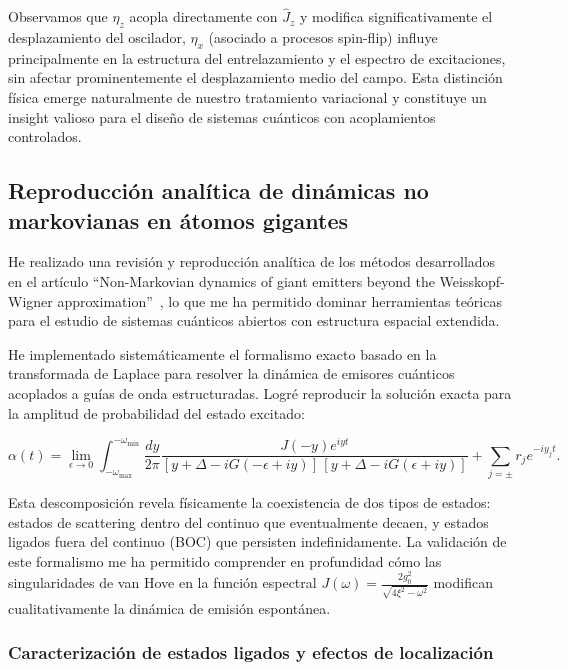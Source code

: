\documentclass[onecolumn,notitlepage,letterpaper,aps,pra,12pt]{article}
\numberwithin{equation}{section}
\begin{document}
Observamos que $\eta_z$ acopla directamente con $\hat{J}_{z}$ y modifica significativamente el desplazamiento del oscilador, $\eta_x$ (asociado a procesos spin-flip) influye principalmente en la estructura del entrelazamiento y el espectro de excitaciones, sin afectar prominentemente el desplazamiento medio del campo. Esta distinción física emerge naturalmente de nuestro tratamiento variacional y constituye un insight valioso para el diseño de sistemas cuánticos con acoplamientos controlados.





\subsection{Reproducción analítica de dinámicas no markovianas en átomos gigantes}

He realizado una revisión y reproducción analítica de los métodos desarrollados en el artículo ``Non-Markovian dynamics of giant emitters beyond the Weisskopf-Wigner approximation''~\cite{gonzalez2025}, lo que me ha permitido dominar herramientas teóricas  para el estudio de sistemas cuánticos abiertos con estructura espacial extendida.

He implementado sistemáticamente el formalismo exacto basado en la transformada de Laplace para resolver la dinámica de emisores cuánticos acoplados a guías de onda estructuradas. Logré reproducir la solución exacta para la amplitud de probabilidad del estado excitado:

\[\alpha(t) = \lim_{\epsilon\to 0}\int_{-\omega_{\max}}^{-\omega_{\min}}\frac{dy}{2\pi}\frac{J(-y)e^{iyt}}{[y+\Delta-iG(-\epsilon+iy)]\,[y+\Delta-iG(\epsilon+iy)]} + \sum_{j=\pm}r_{j}e^{-iy_{j}t}.\]

Esta descomposición revela físicamente la coexistencia de dos tipos de estados: estados de scattering dentro del continuo que eventualmente decaen, y estados ligados fuera del continuo (BOC) que persisten indefinidamente. La validación de este formalismo me ha permitido comprender en profundidad cómo las singularidades de van Hove en la función espectral $J(\omega) = \frac{2g_{0}^{2}}{\sqrt{4\xi^{2}-\omega^{2}}}$ modifican cualitativamente la dinámica de emisión espontánea.

\subsubsection{Caracterización de estados ligados y efectos de localización}
\end{document}
